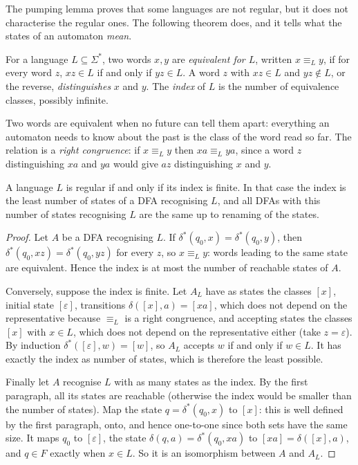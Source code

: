 The pumping lemma proves that some languages are not regular, but it does not characterise the regular ones. The following theorem does, and it tells what the states of an automaton \emph{mean}.

\begin{definition}\label{def:nerode}
For a language $L\subseteq\Sigma^*$, two words $x,y$ are \emph{equivalent for $L$}, written $x\equiv_Ly$, if for every word $z$, $xz\in L$ if and only if $yz\in L$. A word $z$ with $xz\in L$ and $yz\notin L$, or the reverse, \emph{distinguishes} $x$ and $y$. The \emph{index} of $L$ is the number of equivalence classes, possibly infinite.
\end{definition}

Two words are equivalent when no future can tell them apart: everything an automaton needs to know about the past is the class of the word read so far. The relation is a \emph{right congruence}: if $x\equiv_Ly$ then $xa\equiv_Lya$, since a word $z$ distinguishing $xa$ and $ya$ would give $az$ distinguishing $x$ and $y$.

\begin{theorem}\label{thm:myhillnerode}
A language $L$ is regular if and only if its index is finite. In that case the index is the least number of states of a DFA recognising $L$, and all DFAs with this number of states recognising $L$ are the same up to renaming of the states.
\end{theorem}

\begin{proof}
Let $A$ be a DFA recognising $L$. If $\delta^*(q_0,x)=\delta^*(q_0,y)$, then $\delta^*(q_0,xz)=\delta^*(q_0,yz)$ for every $z$, so $x\equiv_Ly$: words leading to the same state are equivalent. Hence the index is at most the number of reachable states of $A$.

Conversely, suppose the index is finite. Let $A_L$ have as states the classes $[x]$, initial state $[\varepsilon]$, transitions $\delta([x],a)=[xa]$, which does not depend on the representative because $\equiv_L$ is a right congruence, and accepting states the classes $[x]$ with $x\in L$, which does not depend on the representative either (take $z=\varepsilon$). By induction $\delta^*([\varepsilon],w)=[w]$, so $A_L$ accepts $w$ if and only if $w\in L$. It has exactly the index as number of states, which is therefore the least possible.

Finally let $A$ recognise $L$ with as many states as the index. By the first paragraph, all its states are reachable (otherwise the index would be smaller than the number of states). Map the state $q=\delta^*(q_0,x)$ to $[x]$: this is well defined by the first paragraph, onto, and hence one-to-one since both sets have the same size. It maps $q_0$ to $[\varepsilon]$, the state $\delta(q,a)=\delta^*(q_0,xa)$ to $[xa]=\delta([x],a)$, and $q\in F$ exactly when $x\in L$. So it is an isomorphism between $A$ and $A_L$.
\end{proof}


